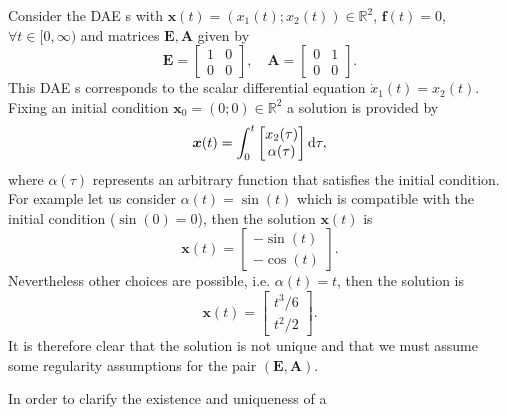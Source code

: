 		\begin{example}
			Consider the DAE s with $\bm{x}(t)=(x_{1}(t);x_{2}(t))\in\mathbb{R}^{2}$, 
			$\bm{f}(t)=0$,$\forall t\in[0,\infty)$ and matrices $\bm{E},\bm{A}$ given by 
			\begin{equation}
				 \bm{E} = 
				 \begin{bmatrix}
				 	1 & 0 \\
				 	0 & 0
				 \end{bmatrix}, \quad
				 \bm{A} = 
				 \begin{bmatrix}
				 	0 & 1 \\
				 	0 & 0
				 \end{bmatrix}.
			\end{equation}
			This DAE s corresponds to the scalar differential equation
			$\dot{x}_{1}(t) = x_{2}(t)$. Fixing an initial condition
			$\bm{x}_{0}=(0;0)\in\mathbb{R}^{2}$ a solution is provided by
			\begin{equation}
				\bm{x}(t) = \int_{0}^{t}
				\begin{bmatrix}
					x_{2}(\tau) \\
					\alpha(\tau)
				\end{bmatrix}
				\mathop{}\!\mathrm{d}\tau,
			\end{equation}
			where $\alpha(\tau)$ represents an arbitrary function that 
			satisfies the initial condition.
			For example let us consider $\alpha(t) = \sin(t)$ which is
			compatible with the initial condition ($\sin(0)=0$),
			then the solution $\bm{x}(t)$ is
			\begin{equation}
				\bm{x}(t) = 
				\begin{bmatrix}
					-\sin(t) \\
					-\cos(t)
				\end{bmatrix}.
			\end{equation}
			Nevertheless other choices are possible, i.e. $\alpha(t) = t$, then the solution is
			\begin{equation}
				\bm{x}(t) = 
				\begin{bmatrix}
					t^{3}/6\\
					t^{2}/2
				\end{bmatrix}.
			\end{equation}
			It is therefore clear that the solution is not unique and
			that we must assume some regularity assumptions
			for the pair $(\bm{E},\bm{A})$.
		\end{example}
		In order to clarify the existence and uniqueness of a
